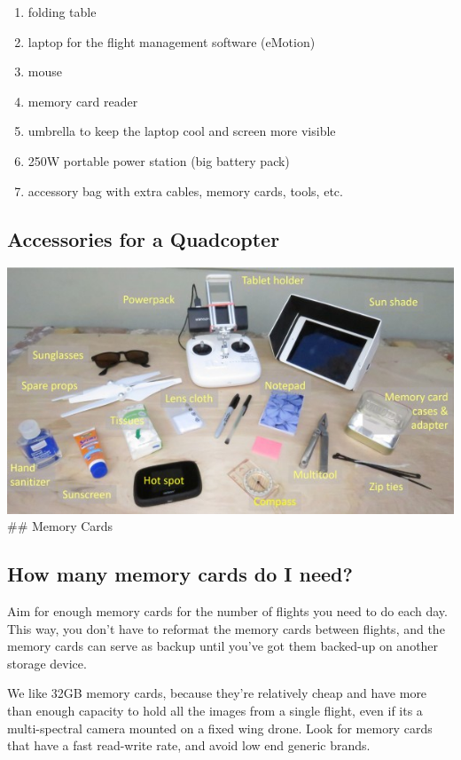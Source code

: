 \documentclass[
]{book}
\providecommand{\tightlist}{%
  \setlength{\itemsep}{0pt}\setlength{\parskip}{0pt}}
\begin{document}
\begin{enumerate}
\def\labelenumi{\arabic{enumi}.}
\tightlist
\item
  folding table
\item
  laptop for the flight management software (eMotion)
\item
  mouse
\item
  memory card reader
\item
  umbrella to keep the laptop cool and screen more visible
\item
  250W portable power station (big battery pack)
\item
  accessory bag with extra cables, memory cards, tools, etc.
\end{enumerate}

\hypertarget{accessories-for-a-quadcopter}{%
\subsection{Accessories for a Quadcopter}\label{accessories-for-a-quadcopter}}

\includegraphics{images/accessories_with_labels_600x330.jpg}
\#\# Memory Cards

\hypertarget{how-many-memory-cards-do-i-need}{%
\subsection{How many memory cards do I need?}\label{how-many-memory-cards-do-i-need}}

Aim for enough memory cards for the number of flights you need to do each day. This way, you don't have to reformat the memory cards between flights, and the memory cards can serve as backup until you've got them backed-up on another storage device.

We like 32GB memory cards, because they're relatively cheap and have more than enough capacity to hold all the images from a single flight, even if its a multi-spectral camera mounted on a fixed wing drone. Look for memory cards that have a fast read-write rate, and avoid low end generic brands.
\end{document}
